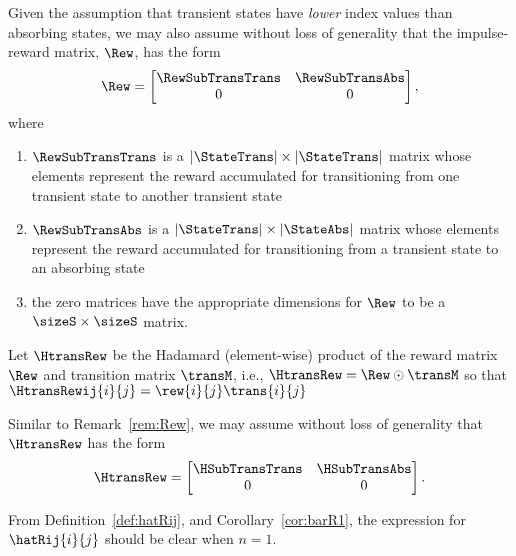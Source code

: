 \begin{remark}
	\label{rem:Rew}
	Given the assumption that transient states have \emph{lower} index values than absorbing states, we may also assume without loss of generality that the impulse-reward matrix, $\Rew$, has the form 
	\begin{equation}
	\label{eq:Rew_sub}
		\Rew = 
			\begin{bmatrix}
				\RewSubTransTrans & \RewSubTransAbs \\ 
				0 & 0
			\end{bmatrix},
	\end{equation}
	where 
	\begin{enumerate}
		\item $\RewSubTransTrans$ is a $|\StateTrans| \times |\StateTrans|$ matrix whose elements represent the reward accumulated for transitioning from one transient state to another transient state
		\item $\RewSubTransAbs$ is a $|\StateTrans| \times |\StateAbs|$ matrix whose elements represent the reward accumulated for transitioning from a transient state to an absorbing state
		\item the zero matrices have the appropriate dimensions for $\Rew$ to be a $\sizeS \times \sizeS$ matrix.
	\end{enumerate}
\end{remark}

\begin{mydef}
	\label{def:HtransRew}
	Let $\HtransRew$ be the Hadamard (element-wise) product of the reward matrix $\Rew$ and transition matrix $\transM$, i.e., $\HtransRew = \Rew \odot \transM$ so that $\HtransRewij{i}{j} = \rew{i}{j}\trans{i}{j}$
\end{mydef}

\begin{remark}
	\label{rem:HtransRew}
	Similar to Remark~\ref{rem:Rew}, we may assume without loss of generality that~$\HtransRew$ has the form 
	\begin{equation}
	\label{eq:HtransRew_sub}
		\HtransRew = 
			\begin{bmatrix}
				\HSubTransTrans & \HSubTransAbs \\ 
				0 & 0
			\end{bmatrix}.
	\end{equation}
\end{remark}

From Definition~\ref{def:hatRij}, and Corollary~\ref{cor:barR1}, the expression for $\hatRij{i}{j}$ should be clear when $n = 1$.

